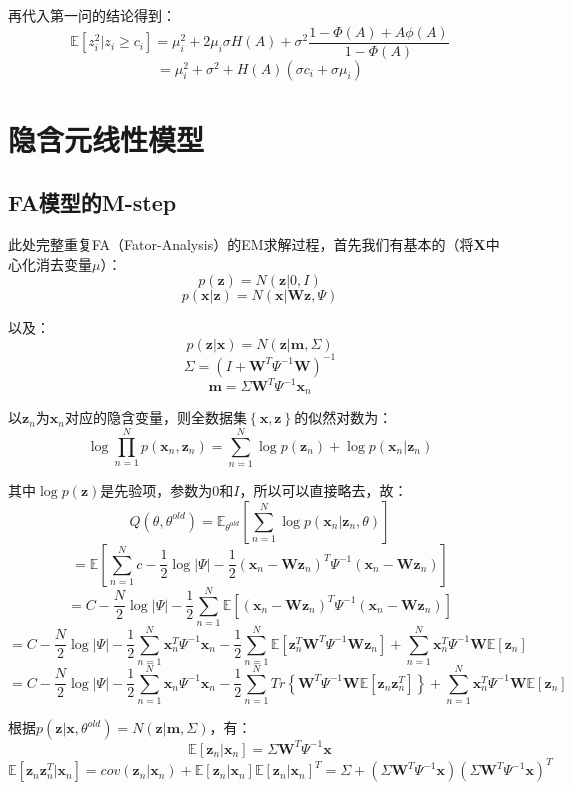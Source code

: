 \documentclass[UTF8]{ctexart}
\begin{document}
再代入第一问的结论得到：
$$\mathbb{E}[z_{i}^{2}|z_{i} \geq c_{i}]=\mu_{i}^{2}+2\mu_{i}\sigma H(A) + \sigma^{2}\frac{1-\Phi(A)+A\phi(A)}{1-\Phi(A)}$$
$$=\mu_{i}^{2} + \sigma^{2} + H(A)(\sigma c_{i} + \sigma \mu_{i})$$

\newpage
\section{隐含元线性模型}
\subsection{FA模型的M-step}
此处完整重复FA（Fator-Analysis）的EM求解过程，首先我们有基本的（将$\textbf{X}$中心化消去变量$\mu$）：
$$p(\textbf{z})=N(\textbf{z}|0,I)$$
$$p(\textbf{x}|\textbf{z})=N(\textbf{x}|\textbf{W}\textbf{z},\Psi)$$

以及：
$$p(\textbf{z}|\textbf{x})=N(\textbf{z}|\textbf{m},\Sigma)$$
$$\Sigma=(I+\textbf{W}^{T}\Psi^{-1}\textbf{W})^{-1}$$
$$\textbf{m}=\Sigma\textbf{W}^{T}\Psi^{-1}\textbf{x}_{n}$$

以$\textbf{z}_{n}$为$\textbf{x}_{n}$对应的隐含变量，则全数据集$\left\{ \textbf{x},\textbf{z} \right\}$的似然对数为：
$$\log \prod_{n=1}^{N}p(\textbf{x}_{n},\textbf{z}_{n})=\sum_{n=1}^{N}\log p(\textbf{z}_{n})+\log p(\textbf{x}_{n}|\textbf{z}_{n})$$

其中$\log p(\textbf{z})$是先验项，参数为$0$和$I$，所以可以直接略去，故：
$$Q(\theta,\theta^{old})=\mathbb{E}_{\theta^{old}}[\sum_{n=1}^{N}\log p(\textbf{x}_{n}|\textbf{z}_{n},\theta)]$$
$$=\mathbb{E}[\sum_{n=1}^{N} c-\frac{1}{2}\log |\Psi|-\frac{1}{2}(\textbf{x}_{n}-\textbf{W}\textbf{z}_{n})^{T}\Psi^{-1}(\textbf{x}_{n}-\textbf{W}\textbf{z}_{n})]$$
$$=C -\frac{N}{2}\log |\Psi|-\frac{1}{2}\sum_{n=1}^{N}\mathbb{E}[(\textbf{x}_{n}-\textbf{W}\textbf{z}_{n})^{T}\Psi^{-1}(\textbf{x}_{n}-\textbf{W}\textbf{z}_{n})]$$
$$=C-\frac{N}{2}\log |\Psi|-\frac{1}{2}\sum_{n=1}^{N}\textbf{x}_{n}^{T}\Psi^{-1}\textbf{x}_{n}-\frac{1}{2}\sum_{n=1}^{N}\mathbb{E}[\textbf{z}_{n}^{T}\textbf{W}^{T}\Psi^{-1}\textbf{W}\textbf{z}_{n}]+\sum_{n=1}^{N}\textbf{x}_{n}^{T}\Psi^{-1}\textbf{W}\mathbb{E}[\textbf{z}_{n}]$$
$$=C-\frac{N}{2}\log |\Psi|-\frac{1}{2}\sum_{n=1}^{N}\textbf{x}_{n}\Psi^{-1}\textbf{x}_{n}-\frac{1}{2}\sum_{n=1}^{N}Tr\left\{ \textbf{W}^{T}\Psi^{-1}\textbf{W}\mathbb{E}[\textbf{z}_{n}\textbf{z}_{n}^{T}]\right\} +\sum_{n=1}^{N}\textbf{x}_{n}^{T}\Psi^{-1}\textbf{W}\mathbb{E}[\textbf{z}_{n}]$$


根据$p(\textbf{z}|\textbf{x},\theta^{old})=N(\textbf{z}|\textbf{m},\Sigma)$，有：
$$\mathbb{E}[\textbf{z}_{n}|\textbf{x}_{n}]=\Sigma\textbf{W}^{T}\Psi^{-1}\textbf{x}$$
$$\mathbb{E}[\textbf{z}_{n}\textbf{z}_{n}^{T}|\textbf{x}_{n}]=cov(\textbf{z}_{n}|\textbf{x}_{n})+\mathbb{E}[\textbf{z}_{n}|\textbf{x}_{n}]\mathbb{E}[\textbf{z}_{n}|\textbf{x}_{n}]^{T}=\Sigma + (\Sigma\textbf{W}^{T}\Psi^{-1}\textbf{x})(\Sigma\textbf{W}^{T}\Psi^{-1}\textbf{x})^{T}$$
\end{document}

